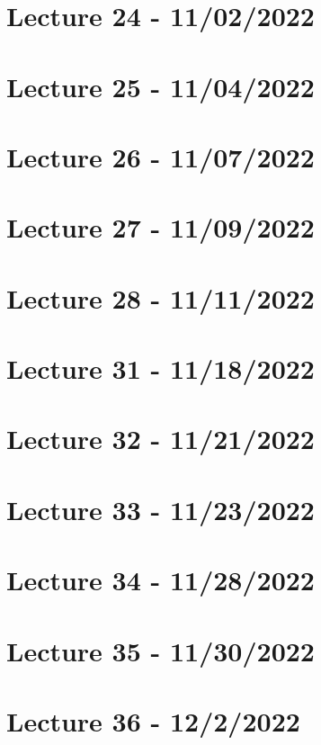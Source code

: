 \documentclass{article}
\begin{document}



\section{Lecture 24 - 11/02/2022}

\section{Lecture 25 - 11/04/2022}

\section{Lecture 26 - 11/07/2022}

\section{Lecture 27 - 11/09/2022}

\section{Lecture 28 - 11/11/2022}






\section{Lecture 31 - 11/18/2022}

\section{Lecture 32 - 11/21/2022}

\section{Lecture 33 - 11/23/2022}

\section{Lecture 34 - 11/28/2022}

\section{Lecture 35 - 11/30/2022}

\section{Lecture 36 - 12/2/2022}



\end{document}
